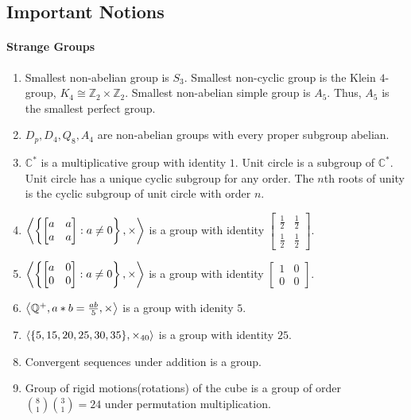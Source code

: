 \subsection*{Important Notions}
\paragraph{Strange Groups}
\begin{enumerate}
	\item Smallest non-abelian group is $S_3$.
	Smallest non-cyclic group is the Klein $4$-group, $K_4 \cong \mathbb{Z}_2 \times \mathbb{Z}_2$.
	Smallest non-abelian simple group is $A_5$. Thus, $A_5$ is the smallest perfect group.
	\item $D_p, D_4, Q_8, A_4$ are non-abelian groups with every proper subgroup abelian. 
	\item $\mathbb{C}^\ast$ is a multiplicative group with identity $1$.
	Unit circle is a subgroup of $\mathbb{C}^\ast$.
	Unit circle has a unique cyclic subgroup for any order.
	The $n$th roots of unity is the cyclic subgroup of unit circle with order $n$.
	\item $ \left\langle \left\{ \begin{bmatrix} a & a \\ a & a \end{bmatrix} : a \ne 0 \right\},\times \right\rangle$ is a group with identity $\begin{bmatrix} \frac{1}{2} & \frac{1}{2} \\ \frac{1}{2} & \frac{1}{2} \end{bmatrix}$.
	\item $ \left\langle \left\{ \begin{bmatrix} a & 0 \\ 0 & 0 \end{bmatrix} : a \ne 0 \right\},\times \right\rangle$ is a group with identity $\begin{bmatrix} 1 & 0 \\ 0 & 0 \end{bmatrix}$.
	\item $\left\langle \mathbb{Q}^+,a \ast b = \frac{ab}{5},\times \right\rangle$ is a group with idenity $5$.
	\item $\left\langle \{5,15,20,25,30,35\},\times_{40} \right\rangle$ is a group with identity $25$.
	\item Convergent sequences under addition is a group.
	\item Group of rigid motions(rotations) of the cube is a group of order $\binom{8}{1}\binom{3}{1}=24$ under permutation multiplication.
\end{enumerate}

